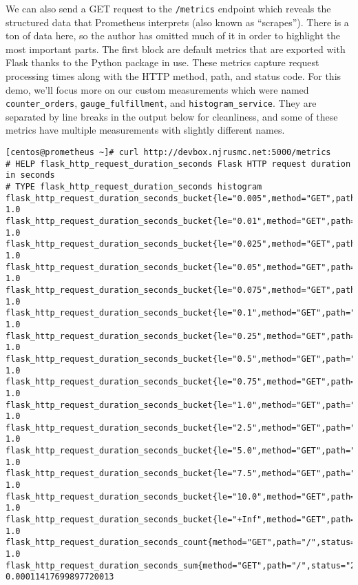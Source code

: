 We can also send a GET request to the \verb|/metrics| endpoint
which reveals the structured data that Prometheus interprets
(also known as ``scrapes''). There is a ton of data here, so
the author has omitted much of it in order to highlight the
most important parts. The first block are default metrics
that are exported with Flask thanks to the Python package
in use. These metrics capture request processing times along with
the HTTP method, path, and status code. For this demo, we'll focus
more on our custom measurements which were named
\verb|counter_orders|, \verb|gauge_fulfillment|, and \verb|histogram_service|.
They are separated by line breaks in the output below for cleanliness, and
some of these metrics have multiple measurements with slightly different names.

\begin{verbatim}
[centos@prometheus ~]# curl http://devbox.njrusmc.net:5000/metrics
# HELP flask_http_request_duration_seconds Flask HTTP request duration in seconds
# TYPE flask_http_request_duration_seconds histogram
flask_http_request_duration_seconds_bucket{le="0.005",method="GET",path="/",status="200"} 1.0
flask_http_request_duration_seconds_bucket{le="0.01",method="GET",path="/",status="200"} 1.0
flask_http_request_duration_seconds_bucket{le="0.025",method="GET",path="/",status="200"} 1.0
flask_http_request_duration_seconds_bucket{le="0.05",method="GET",path="/",status="200"} 1.0
flask_http_request_duration_seconds_bucket{le="0.075",method="GET",path="/",status="200"} 1.0
flask_http_request_duration_seconds_bucket{le="0.1",method="GET",path="/",status="200"} 1.0
flask_http_request_duration_seconds_bucket{le="0.25",method="GET",path="/",status="200"} 1.0
flask_http_request_duration_seconds_bucket{le="0.5",method="GET",path="/",status="200"} 1.0
flask_http_request_duration_seconds_bucket{le="0.75",method="GET",path="/",status="200"} 1.0
flask_http_request_duration_seconds_bucket{le="1.0",method="GET",path="/",status="200"} 1.0
flask_http_request_duration_seconds_bucket{le="2.5",method="GET",path="/",status="200"} 1.0
flask_http_request_duration_seconds_bucket{le="5.0",method="GET",path="/",status="200"} 1.0
flask_http_request_duration_seconds_bucket{le="7.5",method="GET",path="/",status="200"} 1.0
flask_http_request_duration_seconds_bucket{le="10.0",method="GET",path="/",status="200"} 1.0
flask_http_request_duration_seconds_bucket{le="+Inf",method="GET",path="/",status="200"} 1.0
flask_http_request_duration_seconds_count{method="GET",path="/",status="200"} 1.0
flask_http_request_duration_seconds_sum{method="GET",path="/",status="200"} 0.00011417699897720013


\end{verbatim}
